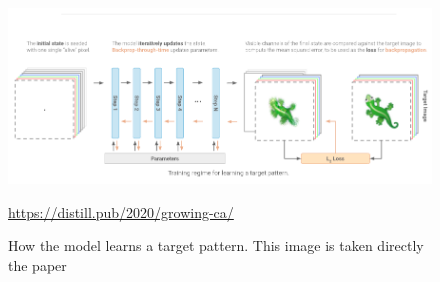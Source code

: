 \begin{figure}[h]
	\includegraphics[width=1\textwidth]{../Figures/training_nca.png}
	\centering
	\caption[NCA-training]{How the model learns a target pattern. This image is taken directly the  paper \cite{growing_nca}} 
	\label{fig:nca-train}
	\url{https://distill.pub/2020/growing-ca/}
\end{figure}

